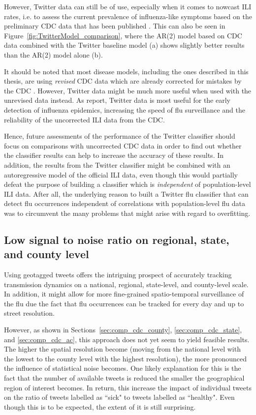 \documentclass[11pt, a4paper,twoside]{report}\usepackage[]{graphicx}\usepackage[]{color}
\begin{document}
However, Twitter data can still be of use, especially when it comes to nowcast ILI rates, i.e. to assess the current prevalence of influenza-like symptoms based on the preliminary CDC data that has been published \citep{paul_worldwide_2015}. This can also be seen in Figure~\ref{fig:TwitterModel_comparison}, where the AR(2) model based on CDC data combined with the Twitter baseline model (a) shows slightly better results than the AR(2) model alone (b). 

It should be noted that most disease models, including the ones described in this thesis, are using \textit{revised} CDC data which are already corrected for mistakes by the CDC \citep{paul_twitter_2014}. However, Twitter data might be much more useful when used with the unrevised data instead. As \cite{aramaki_twitter_2011} report, Twitter data is most useful for the early detection of influenza epidemics, increasing the speed of flu surveillance and the reliability of the uncorrected ILI data from the CDC. 

Hence, future assessments of the performance of the Twitter classifier should focus on comparisons with uncorrected CDC data in order to find out whether the classifier results can help to increase the accuracy of these results. In addition, the results from the Twitter classifier might be combined with an autoregressive model of the official ILI data, even though this would partially defeat the purpose of building a classifier which is \textit{independent} of population-level ILI data. After all, the underlying reason to built a Twitter flu classifier that can detect flu occurrences independent of correlations with population-level flu data was to circumvent the many problems that might arise with regard to overfitting. 

\subsection{Low signal to noise ratio on regional, state, and county level}
Using geotagged tweets offers the intriguing prospect of accurately tracking transmission dynamics on a national, regional, state-level, and county-level scale. In addition, it might allow for more fine-grained spatio-temporal surveillance of the flu due the fact that flu occurrences can be tracked for every day and up to street resolution. 

However, as shown in Sections~\ref{sec:comp_cdc_county}, \ref{sec:comp_cdc_state}, and \ref{sec:comp_cdc_ac}, this approach does not yet seem to yield feasible results. The higher the spatial resolution become (moving from the national level with the lowest to the county level with the highest resolution), the more pronounced the influence of statistical noise becomes. One likely explanation for this is the fact that the number of available tweets is reduced the smaller the geographical region of interest becomes. In return, this increase the impact of individual tweets on the ratio of tweets labelled as ``sick" to tweets labelled as ``healthy". Even though this is to be expected, the extent of it is still surprising. 
\end{document}
